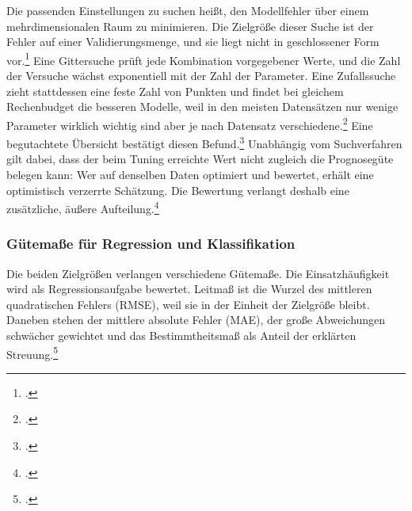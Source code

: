 \documentclass[12pt,a4paper]{article}
\begin{document}
Die passenden Einstellungen zu suchen heißt, den Modellfehler über einem mehrdimensionalen Raum zu
minimieren. Die Zielgröße dieser Suche ist der Fehler auf einer Validierungsmenge, und sie liegt nicht in
geschlossener Form vor.\footcite[319]{Murphy2022} Eine Gittersuche prüft jede Kombination vorgegebener
Werte, und die Zahl der Versuche wächst exponentiell mit der Zahl der Parameter. Eine Zufallssuche
zieht stattdessen eine feste Zahl von Punkten und findet bei gleichem Rechenbudget die besseren
Modelle, weil in den meisten Datensätzen nur wenige Parameter wirklich wichtig sind aber je nach
Datensatz verschiedene.\footcite[281-282]{Bergstra2012} Eine begutachtete Übersicht bestätigt diesen
Befund.\footcite[7-8]{Bischl2023} Unabhängig vom Suchverfahren gilt dabei, dass der beim Tuning
erreichte Wert nicht zugleich die Prognosegüte belegen kann: Wer auf denselben Daten optimiert und
bewertet, erhält eine optimistisch verzerrte Schätzung. Die Bewertung verlangt deshalb eine zusätzliche,
äußere Aufteilung.\footcite[18-19]{Bischl2023}

\subsubsection{Gütemaße für Regression und Klassifikation}

Die beiden Zielgrößen verlangen verschiedene Gütemaße. Die Einsatzhäufigkeit wird als Regressionsaufgabe bewertet. Leitmaß ist die Wurzel des mittleren quadratischen Fehlers (RMSE), weil sie in der Einheit der Zielgröße bleibt. Daneben stehen der mittlere absolute Fehler (MAE), der große Abweichungen schwächer gewichtet und das Bestimmtheitsmaß als Anteil der erklärten Streuung.\footcite[29, 79]{James2023}
\end{document}
